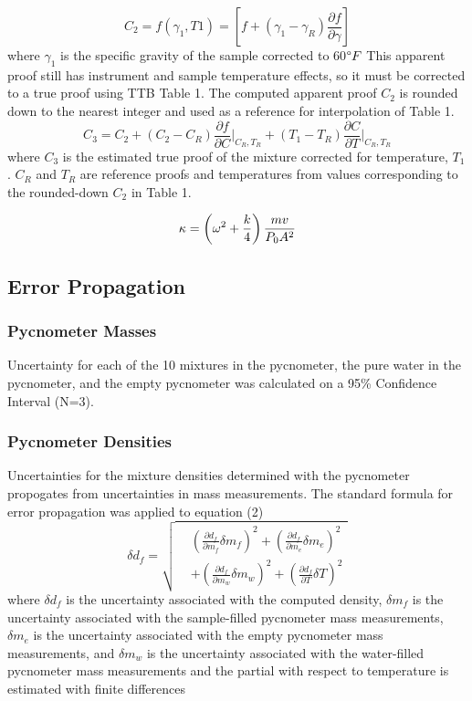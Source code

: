 \documentclass[lettersize,journal]{IEEEtran}
\begin{document}
	\begin{equation}
		\label{deqn_ex4}
		C_{2} = f(\gamma_{1},T1) = [f + (\gamma_{1}-\gamma_{R})\frac{\partial f}{\partial \gamma} ] 
	\end{equation}
	where $\gamma_{1}$ is the specific gravity of the sample corrected to 60$\degree F$
	This apparent proof still has instrument and sample temperature effects, so it must be corrected to a true proof using TTB Table 1. The computed apparent proof $C_{2}$ is rounded down to the nearest integer and used as a reference for interpolation of Table 1.
	\begin{equation}
		\label{deqn_ex5}
		C_3 = C_2 + (C_2 - C_R) \frac{\partial f}{\partial C}\bigg|_{C_R, T_R} + (T_1 - T_R) \frac{\partial C}{\partial T}\bigg|_{C_R, T_R}
	\end{equation}
	where $C_{3}$ is the estimated true proof of the mixture corrected for temperature, $T_{1}$. $C_{R}$ and $T_{R}$ are reference proofs and temperatures from values corresponding to the rounded-down $C_{2}$ in Table 1.
	
	\begin{equation}
		\label{deqn_ex5.5}
		\kappa = \left(\omega^2 + \frac{k}{4}\right) \frac{m v}{P_0 A^2} \\
	\end{equation}
	
	\subsection{Error Propagation}
	\subsubsection{Pycnometer Masses}
	 Uncertainty for each of the 10 mixtures in the pycnometer, the pure water in the pycnometer, and the empty pycnometer was calculated on a 95\% Confidence Interval (N=3). 
	\subsubsection{Pycnometer Densities}
	Uncertainties for the mixture densities determined with the pycnometer propogates from uncertainties in mass measurements. The standard formula for error propagation was applied to equation (2)
	\begin{equation}
		\label{deqn_ex6}
		\delta d_{f} = \sqrt{
			\begin{aligned}
				&\left(\frac{\partial d_{f}}{\partial m_{f}}\delta m_{f}\right)^2 + 
				\left(\frac{\partial d_{f}}{\partial m_{e}}\delta m_{e}\right)^2 \\
				&+ \left(\frac{\partial d_{f}}{\partial m_{w}}\delta m_{w}\right)^2 + 
				\left(\frac{\partial d_{f}}{\partial T}\delta T\right)^2
			\end{aligned}
		}
	\end{equation}
	where $\delta d_{f}$ is the uncertainty associated with the computed density, $\delta m_{f}$ is the uncertainty associated with the sample-filled pycnometer mass measurements, $\delta m_{e}$ is the uncertainty associated with the empty pycnometer mass measurements, and $\delta m_{w}$ is the uncertainty associated with the water-filled pycnometer mass measurements and the partial with respect to temperature is estimated with finite differences  
\end{document}
